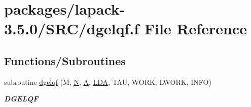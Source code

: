 \hypertarget{dgelqf_8f}{}\section{packages/lapack-\/3.5.0/\+S\+R\+C/dgelqf.f File Reference}
\label{dgelqf_8f}
\subsection*{Functions/\+Subroutines}
\begin{DoxyCompactItemize}
\item 
subroutine \hyperlink{group__doubleGEcomputational_ga436228e38ef5c55e3229502afa2c4220}{dgelqf} (M, \hyperlink{polmisc_8c_a0240ac851181b84ac374872dc5434ee4}{N}, \hyperlink{classA}{A}, \hyperlink{example__user_8c_ae946da542ce0db94dced19b2ecefd1aa}{L\+D\+A}, T\+A\+U, W\+O\+R\+K, L\+W\+O\+R\+K, I\+N\+F\+O)
\begin{DoxyCompactList}\small\item\em {\bfseries D\+G\+E\+L\+Q\+F} \end{DoxyCompactList}\end{DoxyCompactItemize}
